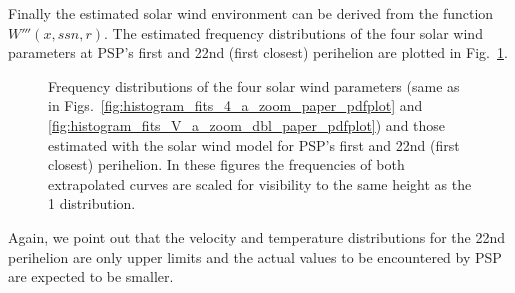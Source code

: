\documentclass[]{aa}
\begin{document}
	Finally the estimated solar wind environment can be derived from the function $W'''(x,ssn,r)$. The estimated frequency distributions of the four solar wind parameters at PSP's first and 22nd (first closest) perihelion are plotted in Fig.~\ref{fig:SPP_sw_distributions_b}.
	\begin{figure}
		\caption{Frequency distributions of the four solar wind parameters (same as in Figs.~\ref{fig:histogram_fits_4_a_zoom_paper_pdfplot} and \ref{fig:histogram_fits_V_a_zoom_dbl_paper_pdfplot}) and those estimated with the solar wind model for PSP's first and 22nd (first closest) perihelion. In these figures the frequencies of both extrapolated curves are scaled for visibility to the same height as the \SI{1}{\au} distribution.}
		\label{fig:SPP_sw_distributions_b}
	\end{figure}
	Again, we point out that the velocity and temperature distributions for the 22nd perihelion are only upper limits and the actual values to be encountered by PSP are expected to be smaller.
\end{document}
